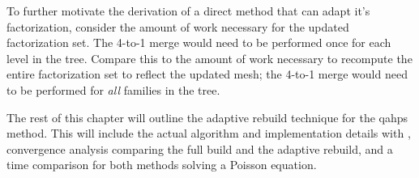 To further motivate the derivation of a direct method that can adapt it's factorization, consider the amount of work necessary for the updated factorization set. The 4-to-1 merge would need to be performed once for each level in the tree. Compare this to the amount of work necessary to recompute the entire factorization set to reflect the updated mesh; the 4-to-1 merge would need to be performed for {\em all} families in the tree.

The rest of this chapter will outline the adaptive rebuild technique for the \gls{qahps} method. This will include the actual algorithm and implementation details with \pforest, convergence analysis comparing the full build and the adaptive rebuild, and a time comparison for both methods solving a Poisson equation.

